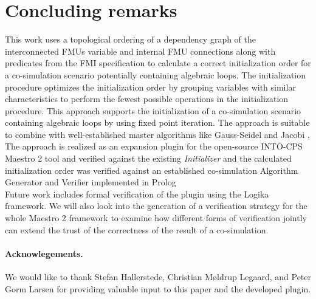 \section{Concluding remarks}\label{sc:summary}
This work uses a topological ordering of a dependency graph of the interconnected FMUs variable and internal FMU connections along with predicates from the FMI specification to calculate a correct initialization order for a co-simulation scenario potentially containing algebraic loops.
The initialization procedure optimizes the initialization order by grouping variables with similar characteristics to perform the fewest possible operations in the initialization procedure.
This approach supports the initialization of a co-simulation scenario containing algebraic loops by using fixed point iteration. 
The approach is suitable to combine with well-established master algorithms like Gauss-Seidel and Jacobi \cite{Palensky2017}. 
The approach is realized as an expansion plugin for the open-source INTO-CPS Maestro 2 tool and verified against the existing \textit{Initializer} and the calculated initialization order was verified against an established co-simulation Algorithm Generator and Verifier implemented in Prolog\cite{gomes_lucio_vangheluwe_2019}\\
Future work includes formal verification of the plugin using the Logika framework\cite{inbook}.
We will also look into the generation of a verification strategy for the whole Maestro 2 framework to examine how different forms of verification jointly can extend the trust of the correctness of the result of a co-simulation. 

\paragraph*{\textbf{Acknowlegements.}}We would like to thank Stefan Hallerstede, Christian Møldrup Legaard, and Peter Gorm Larsen for providing valuable input to this paper and the developed plugin.